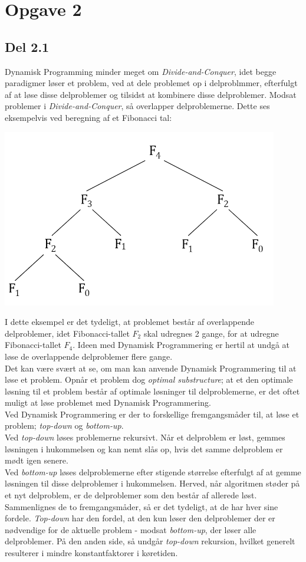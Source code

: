\documentclass{report}
\begin{document}
\newpage


\section*{Opgave 2}
\subsection*{Del 2.1}
Dynamisk Programming minder meget om \textit{Divide-and-Conquer}, idet begge paradigmer løser et problem, ved at dele problemet op i delproblmmer, efterfulgt af at løse disse delproblemer og tilsidst at kombinere disse delproblemer. Modsat problemer i \textit{Divide-and-Conquer}, så overlapper delproblemerne. Dette ses eksempelvis ved beregning af et Fibonacci tal:
\begin{center}
    \includegraphics[height = 4 cm]{../entities/DP_fibonacci.PNG}
\end{center}
I dette eksempel er det tydeligt, at problemet består af overlappende delproblemer, idet Fibonacci-tallet $F_2$ skal udregnes 2 gange, for at udregne Fibonacci-tallet $F_4$. Ideen med Dynamisk Programmering er hertil at undgå at løse de overlappende delproblemer flere gange. \\
Det kan være svært at se, om man kan anvende Dynamisk Programmering til at løse et problem. Opnår et problem dog \textit{optimal substructure}; at et den optimale løsning til et problem består af optimale løsninger til delproblemerne, er det oftet muligt at løse problemet med Dynamisk Programmering. \\
Ved Dynamisk Programmering er der to forskellige fremgangsmåder til, at løse et problem; \textit{top-down} og \textit{bottom-up}. \\
Ved \textit{top-down} løses problemerne rekursivt. Når et delproblem er løst, gemmes løsningen i hukommelsen og kan nemt slås op, hvis det samme delproblem er mødt igen senere. \\
Ved \textit{bottom-up} løses delproblemerne efter stigende størrelse efterfulgt af at gemme løsningen til disse delproblemer i hukommelsen. Herved, når algoritmen støder på et nyt delproblem, er de delproblemer som den består af allerede løst. \\
Sammenlignes de to fremgangsmåder, så er det tydeligt, at de har hver sine fordele. \textit{Top-down} har den fordel, at den kun løser den delproblemer der er nødvendige for de aktuelle problem - modsat \textit{bottom-up}, der løser alle delproblemer. På den anden side, så undgår \textit{top-down} rekursion, hvilket generelt resulterer i mindre konstantfaktorer i køretiden.
\end{document}
